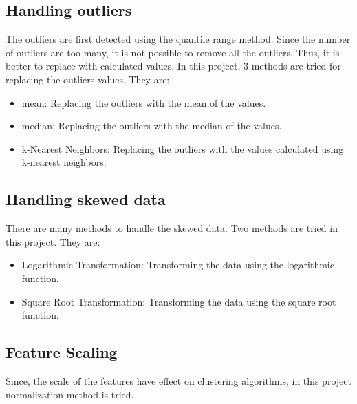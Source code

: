 \documentclass{article}
\begin{document}
        \hfill

        \begingroup
            \subsection{Handling outliers}

            The outliers are first detected using the quantile range method.
            Since the number of outliers are too many, it is not possible to remove all the outliers.
            Thus, it is better to replace with calculated values.
            In this project, 3 methods are tried for replacing the outliers values. They are:
            \begin{itemize}
                \item mean: Replacing the outliers with the mean of the values.
                \item median: Replacing the outliers with the median of the values.
                \item k-Nearest Neighbors: Replacing the outliers with the values calculated using k-nearest neighbors.
            \end{itemize}
        \endgroup

        \hfill

        \begingroup
            \subsection{Handling skewed data}

            There are many methods to handle the skewed data. 
            Two methods are tried in this project. They are:
            \begin{itemize}
                \item Logarithmic Transformation: Transforming the data using the logarithmic function.
                \item Square Root Transformation: Transforming the data using the square root function.
            \end{itemize}
        \begingroup

        \hfill

        \begingroup
            \subsection{Feature Scaling}

            Since, the scale of the features have effect on clustering algorithms, in this project normalization method is tried.
        \endgroup
\end{document}
